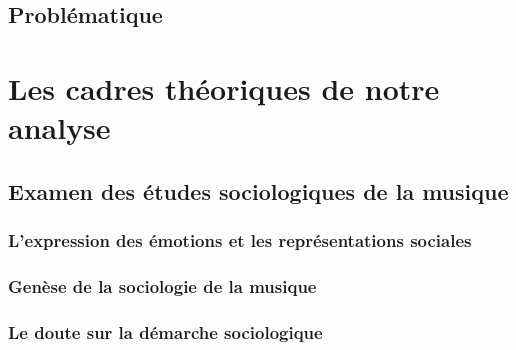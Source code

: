 \documentclass[%
  12pt,oneside,output=paper%
  ,output=paper%
]{yathesis}
\begin{document}
\maketitle


\makefrontepigraphs


\makeabstract


\tableofcontents


\mainmatter

\chapter*{Problématique}%









\part{Les cadres théoriques de notre analyse} 


\chapter{Examen des études sociologiques de la musique}





\section{L'expression des émotions et les représentations sociales}







\section{Genèse de la sociologie de la musique}






\section{Le doute sur la démarche sociologique}
\end{document}
